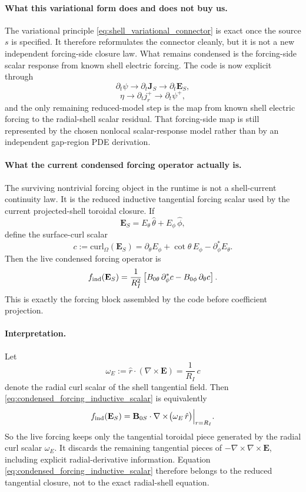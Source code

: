 \documentclass[11pt,a4paper]{article}
\begin{document}
\paragraph{What this variational form does and does not buy us.}
The variational principle \eqref{eq:shell_variational_connector} is exact once
the source \(s\) is specified. It therefore reformulates the connector cleanly,
but it is not a new independent forcing-side closure law. What remains
condensed is the forcing-side scalar response from known shell electric
forcing. The code is now explicit through
\[
\partial_t\psi \to \partial_t\mathbf J_S \to \partial_t\mathbf E_S,
\]
\[
\eta \to \partial_t j_r^+ \to \partial_t\psi^+,
\]
and the only remaining reduced-model step is the map from known shell electric
forcing to the radial-shell scalar residual. That forcing-side map is still
represented by the chosen nonlocal scalar-response model rather than by an
independent gap-region PDE derivation.

\paragraph{What the current condensed forcing operator actually is.}
The surviving nontrivial forcing object in the runtime is not a shell-current
continuity law. It is the reduced inductive tangential forcing scalar used by
the current projected-shell toroidal closure. If
\[
\mathbf E_S = E_\theta\,\hat\theta + E_\phi\,\hat\phi,
\]
define the surface-curl scalar
\begin{equation}
c
:=
\mathrm{curl}_\Omega(\mathbf E_S)
=
\partial_\theta E_\phi + \cot\theta\,E_\phi - \partial_\phi^\ast E_\theta.
\label{eq:condensed_forcing_surface_curl}
\end{equation}
Then the live condensed forcing operator is
\begin{equation}
f_{\rm ind}(\mathbf E_S)
=
\frac{1}{R_I^2}
\left[
B_{0\theta}\,\partial_\phi^\ast c
- B_{0\phi}\,\partial_\theta c
\right].
\label{eq:condensed_forcing_inductive_scalar}
\end{equation}
This is exactly the forcing block assembled by the code before coefficient
projection.

\paragraph{Interpretation.}
Let
\[
\omega_E := \hat r\cdot(\nabla\times \mathbf E)
= \frac{1}{R_I}\,c
\]
denote the radial curl scalar of the shell tangential field. Then
\eqref{eq:condensed_forcing_inductive_scalar} is equivalently
\begin{equation}
f_{\rm ind}(\mathbf E_S)
=
\mathbf B_{0S}\cdot
\nabla\times\!\bigl(\omega_E\,\hat r\bigr)\Big|_{r=R_I}.
\label{eq:condensed_forcing_toroidal_vector_form}
\end{equation}
So the live forcing keeps only the tangential toroidal piece generated by the
radial curl scalar \(\omega_E\). It discards the remaining tangential pieces of
\(-\nabla\times\nabla\times \mathbf E\), including explicit radial-derivative
information. Equation \eqref{eq:condensed_forcing_inductive_scalar} therefore
belongs to the reduced tangential closure, not to the exact radial-shell
equation.
\end{document}
